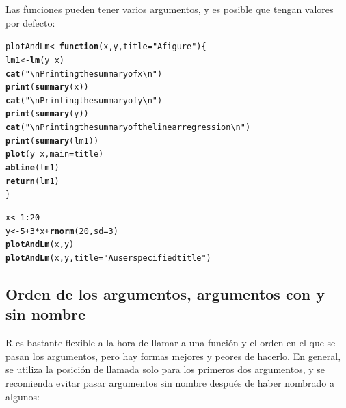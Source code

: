 \documentclass{config/apuntes}\usepackage[]{graphicx}\usepackage[]{xcolor}
\makeatletter
\newcommand{\hlnum}[1]{\textcolor[rgb]{0.686,0.059,0.569}{#1}}%
\newcommand{\hlsng}[1]{\textcolor[rgb]{0.192,0.494,0.8}{#1}}%
\newcommand{\hlopt}[1]{\textcolor[rgb]{0,0,0}{#1}}%
\newcommand{\hldef}[1]{\textcolor[rgb]{0.345,0.345,0.345}{#1}}%
\newcommand{\hlkwa}[1]{\textcolor[rgb]{0.161,0.373,0.58}{\textbf{#1}}}%
\newcommand{\hlkwb}[1]{\textcolor[rgb]{0.69,0.353,0.396}{#1}}%
\newcommand{\hlkwc}[1]{\textcolor[rgb]{0.333,0.667,0.333}{#1}}%
\newcommand{\hlkwd}[1]{\textcolor[rgb]{0.737,0.353,0.396}{\textbf{#1}}}%
\newenvironment{kframe}{%
 \def\at@end@of@kframe{}%
 \ifinner\ifhmode%
  \def\at@end@of@kframe{\end{minipage}}%
  \begin{minipage}{\columnwidth}%
 \fi\fi%
 \def\FrameCommand##1{\hskip\@totalleftmargin \hskip-\fboxsep
 \colorbox{shadecolor}{##1}\hskip-\fboxsep
     \hskip-\linewidth \hskip-\@totalleftmargin \hskip\columnwidth}%
 \MakeFramed {\advance\hsize-\width
   \@totalleftmargin\z@ \linewidth\hsize
   \@setminipage}}%
 {\par\unskip\endMakeFramed%
 \at@end@of@kframe}
\newenvironment{knitrout}{}{} %
\makeatother
\begin{document}
Las funciones pueden tener varios argumentos, y es posible que tengan valores por defecto:

\begin{knitrout}
\color{fgcolor}\begin{kframe}
\begin{alltt}
\hldef{plotAndLm} \hlkwb{<-} \hlkwa{function}\hldef{(}\hlkwc{x}\hldef{,} \hlkwc{y}\hldef{,} \hlkwc{title} \hldef{=} \hlsng{"A figure"}\hldef{) \{}
  \hldef{lm1} \hlkwb{<-} \hlkwd{lm}\hldef{(y} \hlopt{~} \hldef{x)}
  \hlkwd{cat}\hldef{(}\hlsng{"\textbackslash{}n Printing the summary of x\textbackslash{}n"}\hldef{)}
  \hlkwd{print}\hldef{(}\hlkwd{summary}\hldef{(x))}
  \hlkwd{cat}\hldef{(}\hlsng{"\textbackslash{}n Printing the summary of y\textbackslash{}n"}\hldef{)}
  \hlkwd{print}\hldef{(}\hlkwd{summary}\hldef{(y))}
  \hlkwd{cat}\hldef{(}\hlsng{"\textbackslash{}n Printing the summary of the linear regression\textbackslash{}n"}\hldef{)}
  \hlkwd{print}\hldef{(}\hlkwd{summary}\hldef{(lm1))}
  \hlkwd{plot}\hldef{(y} \hlopt{~} \hldef{x,} \hlkwc{main} \hldef{= title)}
  \hlkwd{abline}\hldef{(lm1)}
  \hlkwd{return}\hldef{(lm1)}
\hldef{\}}

\hldef{x} \hlkwb{<-} \hlnum{1}\hlopt{:}\hlnum{20}
\hldef{y} \hlkwb{<-} \hlnum{5} \hlopt{+} \hlnum{3} \hlopt{*}\hldef{x} \hlopt{+} \hlkwd{rnorm}\hldef{(}\hlnum{20}\hldef{,} \hlkwc{sd} \hldef{=} \hlnum{3}\hldef{)}
\hlkwd{plotAndLm}\hldef{(x, y)}
\hlkwd{plotAndLm}\hldef{(x, y,} \hlkwc{title} \hldef{=} \hlsng{"A user specified title"}\hldef{)}
\end{alltt}
\end{kframe}
\end{knitrout}

\subsection{Orden de los argumentos, argumentos con y sin nombre}
R es bastante flexible a la hora de llamar a una función y el orden en el que se pasan los argumentos, pero hay formas mejores y peores de hacerlo. En general, se utiliza la posición de llamada solo para los primeros dos argumentos, y se recomienda evitar pasar argumentos sin nombre después de haber nombrado a algunos:
\end{document}
